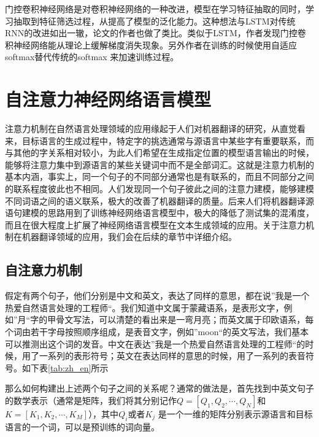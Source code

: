 \documentclass[twoside,a4paper,12pt]{book}%
\begin{document}
门控卷积神经网络是对卷积神经网络的一种改进，模型在学习特征抽取的同时，学习抽取到特征筛选过程，从提高了模型的泛化能力。这种想法与\gls{LSTM}对传统\gls{RNN}的改进如出一辙，论文的作者也做了类比。类似于\gls{LSTM}，作者发现门控卷积神经网络能从理论上缓解梯度消失现象。另外作者在训练的时候使用自适应softmax替代传统的softmax 来加速训练过程。

\section{自注意力神经网络语言模型}
注意力机制在自然语言处理领域的应用缘起于人们对机器翻译的研究，从直觉看来，目标语言的生成过程中，特定字的挑选通常与源语言中某些字有重要联系，而与其他的字关系相对较小，为此人们希望在生成指定位置的模型语言输出的时候，能够将注意力集中到源语言的某些关键词中而不是全部词汇。这就是注意力机制的基本内涵，事实上，同一个句子的不同部分通常也是有联系的，而且不同部分之间的联系程度彼此也不相同。人们发现同一个句子彼此之间的注意力建模，能够建模不同词语之间的语义联系，极大的改善了机器翻译的质量。后来人们将机器翻译源语句建模的思路用到了训练神经网络语言模型中，极大的降低了测试集的混淆度，而且在很大程度上扩展了神经网络语言模型在文本生成领域的应用。关于注意力机制在机器翻译领域的应用，我们会在后续的章节中详细介绍。

\subsection{自注意力机制}
假定有两个句子，他们分别是中文和英文，表达了同样的意思，都在说”我是一个热爱自然语言处理的工程师“。我们知道中文属于蒙藏语系，是表形文字，例如”月“字的甲骨文写法，可以清楚的看出来是一弯月亮；而英文属于印欧语系，每个词由若干字母按照顺序组成，是表音文字，例如”moon“的英文写法，我们基本可以推测出这个词的发音。中文在表达”我是一个热爱自然语言处理的工程师“的时候，用了一系列的表形符号；英文在表达同样的意思的时候，用了一系列的表音符号。如下表\ref{tab:zh_en}所示
\begin{table}[h]
	\caption{中英文表意对比}  
	\label{tab:zh_en}
	\centering
\end{table}
那么如何构建出上述两个句子之间的关系呢？通常的做法是，首先找到中英文句子的数学表示（通常是矩阵，我们将其分别记作$Q=[Q_1,Q_2,\cdots,Q_N]$和$K=[K_1,K_2,\cdots,K_M]$），其中$Q_i$或者$K_j$ 是一个一维的矩阵分别表示源语言和目标语言的一个词，可以是预训练的词向量。
\end{document}
